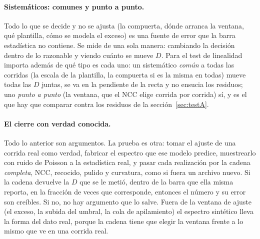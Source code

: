 \documentclass[11pt,a4paper]{article}
\begin{document}
\paragraph{Sistemáticos: comunes y punto a punto.} Todo lo que se decide y no
se ajusta (la compuerta, dónde arranca la ventana, qué plantilla, cómo se
modela el exceso) es una fuente de error que la barra estadística no
contiene. Se mide de una sola manera: cambiando la decisión dentro de lo
razonable y viendo cuánto se mueve $D$. Para el test de linealidad importa
además de qué tipo es cada uno: un sistemático \emph{común} a todas las
corridas (la escala de la plantilla, la compuerta si es la misma en todas)
mueve todas las $D$ juntas, se va en la pendiente de la recta y no ensucia
los residuos; uno \emph{punto a punto} (la ventana, que el NCC elige corrida
por corrida) sí, y es el que hay que comparar contra los residuos de la
sección~\ref{sec:testA}.

\paragraph{El cierre con verdad conocida.} Todo lo anterior son argumentos.
La prueba es otra: tomar el ajuste de una corrida real como verdad, fabricar
el espectro que ese modelo predice, muestrearlo con ruido de Poisson a la
estadística real, y pasar cada realización por la cadena \emph{completa},
NCC, recocido, pulido y curvatura, como si fuera un archivo nuevo. Si la
cadena devuelve la $D$ que se le metió, dentro de la barra que ella misma
reporta, en la fracción de veces que corresponde, entonces el número y su
error son creíbles. Si no, no hay argumento que lo salve. Fuera de la ventana
de ajuste (el exceso, la subida del umbral, la cola de apilamiento) el
espectro sintético lleva la forma del dato real, porque la cadena tiene que
elegir la ventana frente a lo mismo que ve en una corrida real.

\begin{table}[htbp]
\centering
\caption{El cierre con verdad conocida sobre \EjCorrida, con las dos formas
de pesar el $\chi^2$. La cobertura cuenta en cuántas realizaciones la $D$
verdadera quedó dentro de la barra reportada; con barras correctas se espera
el 68\,\%.}
\label{tab:cierre}
\footnotesize

\end{table}
\end{document}
